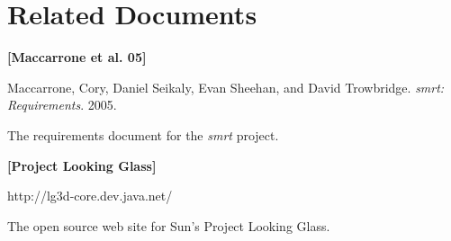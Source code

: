 \documentclass[letterpaper, titlepage, 11pt]{article}
\begin{document}
\appendix

\section{Related Documents}

\begin{list}{}{
\setlength{\parsep}{1ex}
\setlength{\leftmargin}{0.5in}
\setlength{\itemindent}{-0.5in}
}

\item[] \textbf{[Maccarrone et al. 05]}

	Maccarrone, Cory, Daniel Seikaly, Evan Sheehan, and David Trowbridge.
	\textit{smrt: Requirements}. 2005.

	The requirements document for the \textit{smrt} project.

\item[] \textbf{[Project Looking Glass]}

	http://lg3d-core.dev.java.net/

	The open source web site for Sun's Project Looking Glass.
\end{list}
\end{document}
